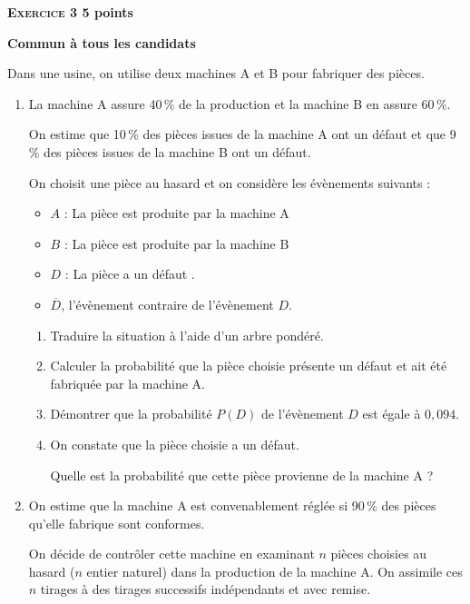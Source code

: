 \documentclass[10pt]{article}
\begin{document}
\vspace{0,5cm}

\textbf{\textsc{Exercice 3} \hfill 5 points}
 
\textbf{Commun à tous les candidats}

\medskip
 
Dans une usine, on utilise deux machines A et B pour fabriquer des pièces. 


\medskip

\begin{enumerate}
\item La machine A assure 40\,\% de la production et la machine B en assure 60\,\%.
 
On estime que 10\,\% des pièces issues de la machine A ont un défaut et que 9\,\% des pièces issues de la machine B ont un défaut.
 
On choisit une pièce au hasard et on considère les évènements suivants : 


\setlength\parindent{5mm}
\begin{itemize}
\item $A$ : \og La pièce est produite par la machine A \fg
\item $B$ : \og La pièce est produite par la machine B \fg
\item $D$ : \og La pièce a un défaut \fg.
\item $\overline{D}$,  l'évènement contraire de l'évènement $D$.
\end{itemize}
\setlength\parindent{0mm}
 
	\begin{enumerate}
		\item Traduire la situation à l'aide d'un arbre pondéré. 
		\item Calculer la probabilité que la pièce choisie présente un défaut et ait été fabriquée par la machine A. 
		\item Démontrer que la probabilité $P(D)$ de l'évènement $D$ est égale à $0,094$. 
		\item On constate que la pièce choisie a un défaut.
		 
Quelle est la probabilité que cette pièce provienne de la machine A ?
	\end{enumerate} 
\item On estime que la machine A est convenablement réglée si 90\,\% des pièces qu'elle fabrique sont conformes.
 
On décide de contrôler cette machine en examinant $n$ pièces choisies au hasard ($n$ entier naturel) dans la production de la machine A. On assimile ces $n$ tirages à des tirages successifs indépendants et avec remise.
 

\end{enumerate}
\end{document}
